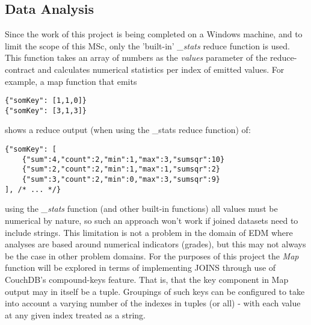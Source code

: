 \subsection{Data Analysis}



Since the work of this project is being completed on a Windows machine, and to limit the scope of this MSc, only the 'built-in' \textit{\_stats} reduce function is used. This function takes an array of numbers as the \textit{values} parameter of the reduce-contract and calculates numerical statistics per index of emitted values. For example, a map function that emits

\begin{verbatim}
{"somKey": [1,1,0]}
{"somKey": [3,1,3]}
\end{verbatim}

shows a reduce output (when using the \_stats reduce function) of:

\begin{verbatim}
{"somKey": [
    {"sum":4,"count":2,"min":1,"max":3,"sumsqr":10}
    {"sum":2,"count":2,"min":1,"max":1,"sumsqr":2}
    {"sum":3,"count":2,"min":0,"max":3,"sumsqr":9}
], /* ... */}
\end{verbatim}

using the \textit{\_stats} function (and other built-in functions) all values must be numerical by nature, so such an approach won't work if joined datasets need to include strings. This limitation is not a problem in the domain of EDM where analyses are based around numerical indicators (grades), but this may not always be the case in other problem domains. For the purposes of this project the \textit{Map} function will be explored in terms of implementing JOINS through use of CouchDB's compound-keys feature. That is, that the key component in Map output may in itself be a tuple. Groupings of such keys can be configured to take into account a varying number of the indexes in tuples (or all) - with each value at any given index treated as a string.

